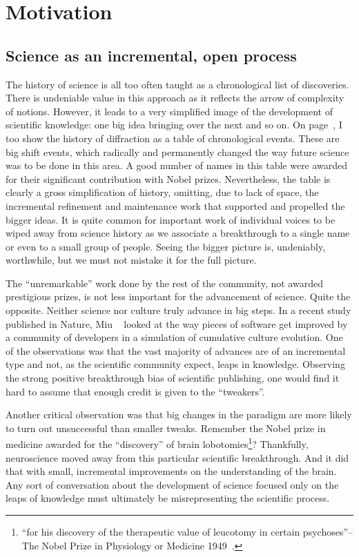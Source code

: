 \chapter{Motivation}

\section{Science as an incremental, open process}

The history of science is all too often taught as a chronological list of discoveries. There is undeniable value in this approach as it reflects the arrow of complexity of notions. However, it leads to a very simplified image of the development of scientific knowledge: one big idea bringing over the next and so on. On page~\pageref{table:historyDiff}, I too show the history of diffraction as a table of chronological events. These are big shift events, which radically and permanently changed the way future science was to be done in this area. A good number of names in this table were awarded for their significant contribution with Nobel prizes. Nevertheless, the table is clearly a gross simplification of history, omitting, due to lack of space, the incremental refinement and maintenance work that supported and propelled the bigger ideas. It is quite common for important work of individual voices to be wiped away from science history as we associate a breakthrough to a single name or even to a small group of people. Seeing the bigger picture is, undeniably, worthwhile, but we must not mistake it for the full picture.

The ``unremarkable'' work done by the rest of the community, not awarded prestigious prizes, is not less important for the advancement of science. Quite the opposite. Neither science nor culture truly advance in big steps. In a recent study published in Nature, Miu \etal~\cite{Miu2018} looked at the way pieces of software get improved by a community of developers in a simulation of cumulative culture evolution. One of the observations was that the vast majority of advances are of an incremental type and not, as the scientific community expect, leaps in knowledge. Observing the strong positive breakthrough bias of scientific publishing, one would find it hard to assume that enough credit is given to the ``tweakers''. 

Another critical observation was that big changes in the paradigm are more likely to turn out unsuccessful than smaller tweaks. Remember the Nobel prize in medicine awarded for the ``discovery'' of brain lobotomies\footnote{``for his discovery of the therapeutic value of leucotomy in certain psychoses''-- The Nobel Prize in Physiology or Medicine 1949~\cite{Nobel49}.}? Thankfully, neuroscience moved away from this particular scientific breakthrough. And it did that with small, incremental improvements on the understanding of the brain. Any sort of conversation about the development of science focused only on the leaps of knowledge must ultimately be misrepresenting the scientific process.


